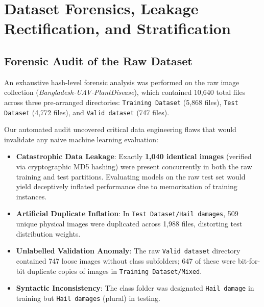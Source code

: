 \documentclass[11pt,a4paper]{article}
\begin{document}
\section{Dataset Forensics, Leakage Rectification, and Stratification}

\subsection{Forensic Audit of the Raw Dataset}
An exhaustive hash-level forensic analysis was performed on the raw image collection (\textit{Bangladesh-UAV-PlantDisease}), which contained 10,640 total files across three pre-arranged directories: \texttt{Training Dataset} (5,868 files), \texttt{Test Dataset} (4,772 files), and \texttt{Valid dataset} (747 files). 

Our automated audit uncovered critical data engineering flaws that would invalidate any naive machine learning evaluation:
\begin{itemize}
    \item \textbf{Catastrophic Data Leakage}: Exactly \textbf{1,040 identical images} (verified via cryptographic MD5 hashing) were present concurrently in both the raw training and test partitions. Evaluating models on the raw test set would yield deceptively inflated performance due to memorization of training instances.
    \item \textbf{Artificial Duplicate Inflation}: In \texttt{Test Dataset/Hail damages}, 509 unique physical images were duplicated across 1,988 files, distorting test distribution weights.
    \item \textbf{Unlabelled Validation Anomaly}: The raw \texttt{Valid dataset} directory contained 747 loose images without class subfolders; 647 of these were bit-for-bit duplicate copies of images in \texttt{Training Dataset/Mixed}.
    \item \textbf{Syntactic Inconsistency}: The class folder was designated \texttt{Hail damage} in training but \texttt{Hail damages} (plural) in testing.
\end{itemize}
\end{document}
